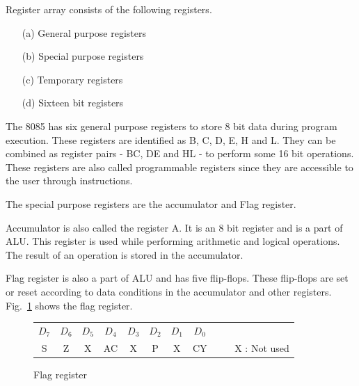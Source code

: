 Register array consists of the following registers.
\begin{itemize}
\itemsep=2pt
\item[(a)] General purpose registers

\item[(b)] Special purpose registers

\item[(c)] Temporary registers

\item[(d)] Sixteen bit registers
\end{itemize}

\smallskip
{}

The 8085 has six general purpose registers to store 8 bit data during program execution. These registers are identified as B, C, D, E, H and L. They can be combined as register pairs - BC, DE and HL - to perform some 16 bit operations. These registers are also called programmable registers since they are accessible to the user through instructions.

\smallskip
{}

The special purpose registers are the accumulator and Flag register.

\smallskip
{}

Accumulator is also called the register A. It is an 8 bit register and is a part of ALU. This register is used while performing arithmetic and logical operations. The result of an operation is stored in the accumulator.

\smallskip
{}

Flag register is also a part of ALU and has five flip-flops. These flip-flops are set or reset according to data conditions in the accumulator and other registers. Fig.~\ref{fig7.5} shows the flag register.
\begin{figure}[H]
\centering
\caption{Flag register}\label{fig7.5}
\renewcommand{\arraystretch}{1.2}
\begin{tabular}{|c|c|c|c|c|c|c|c|c}
\multicolumn{1}{c}{$D_{7}$} & \multicolumn{1}{c}{$D_{6}$} & \multicolumn{1}{c}{$D_{5}$} & \multicolumn{1}{c}{$D_{4}$} & \multicolumn{1}{c}{$D_{3}$} & \multicolumn{1}{c}{$D_{2}$} & \multicolumn{1}{c}{$D_{1}$} & \multicolumn{1}{c}{$D_{0}$} & \multicolumn{1}{c}{}\\
\cline{1-8}
S & Z & X & AC & X & P & X & CY &~~~ X : Not used\\
\cline{1-8}
\end{tabular}
\end{figure}

